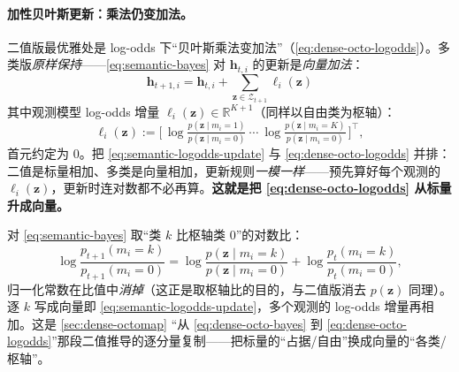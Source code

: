 \paragraph{加性贝叶斯更新：乘法仍变加法。}
二值版最优雅处是 log-odds 下“贝叶斯乘法变加法”（\cref{eq:dense-octo-logodds}）。多类版\emph{原样保持}——\cref{eq:semantic-bayes} 对 $\mathbf{h}_{t,i}$ 的更新是\emph{向量加法}：
\begin{equation}
  \boxed{\ \mathbf{h}_{t+1,i}=\mathbf{h}_{t,i}+\sum_{\mathbf{z}\in\mathcal{Z}_{t+1}}\boldsymbol\ell_i(\mathbf{z})\ }
  \label{eq:semantic-logodds-update}
\end{equation}
其中观测模型 log-odds 增量 $\boldsymbol\ell_i(\mathbf{z})\in\mathbb{R}^{K+1}$（同样以自由类为枢轴）：
\begin{equation}
  \boldsymbol\ell_i(\mathbf{z}):=\Big[\,\log\tfrac{p(\mathbf{z}\mid m_i=1)}{p(\mathbf{z}\mid m_i=0)}\ \cdots\ \log\tfrac{p(\mathbf{z}\mid m_i=K)}{p(\mathbf{z}\mid m_i=0)}\,\Big]^\top,
  \label{eq:semantic-logodds-obs}
\end{equation}
首元约定为 $0$\cite{asgharivaskasi2023semantic}。把 \cref{eq:semantic-logodds-update} 与 \cref{eq:dense-octo-logodds} 并排：二值是标量相加、多类是向量相加，更新规则\emph{一模一样}——预先算好每个观测的 $\boldsymbol\ell_i(\mathbf{z})$，更新时连对数都不必再算。\textbf{这就是把 \cref{eq:dense-octo-logodds} 从标量升成向量。}

\begin{derivation}
对 \cref{eq:semantic-bayes} 取“类 $k$ 比枢轴类 $0$”的对数比：
\[
  \log\frac{p_{t+1}(m_i{=}k)}{p_{t+1}(m_i{=}0)}
  =\log\frac{p(\mathbf{z}\mid m_i{=}k)}{p(\mathbf{z}\mid m_i{=}0)}+\log\frac{p_t(m_i{=}k)}{p_t(m_i{=}0)},
\]
归一化常数在比值中\emph{消掉}（这正是取枢轴比的目的，与二值版消去 $p(\mathbf{z})$ 同理）。逐 $k$ 写成向量即 \cref{eq:semantic-logodds-update}，多个观测的 log-odds 增量再相加。这是 \cref{sec:dense-octomap} “从 \cref{eq:dense-octo-bayes} 到 \cref{eq:dense-octo-logodds}”那段二值推导的逐分量复制——把标量的“占据/自由”换成向量的“各类/枢轴”。
\end{derivation}

